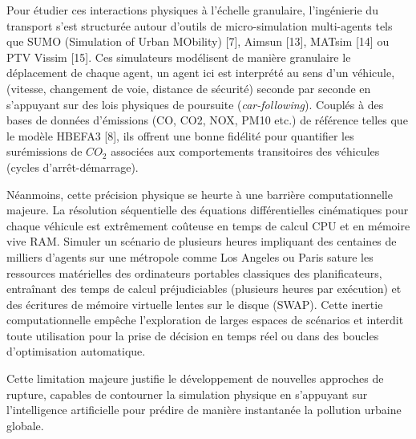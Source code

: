 \documentclass[10pt, a4paper]{article}
\begin{document}
Pour étudier ces interactions physiques à l'échelle granulaire,
l'ingénierie du transport s'est structurée autour d'outils de
micro-simulation multi-agents tels que SUMO (Simulation of Urban
MObility) {[}7{]}, Aimsun {[}13{]}, MATsim {[}14{]} ou PTV Vissim
{[}15{]}. Ces simulateurs modélisent de manière granulaire le
déplacement de chaque agent, un agent ici est interprété au sens d'un
véhicule, (vitesse, changement de voie, distance de sécurité) seconde
par seconde en s'appuyant sur des lois physiques de poursuite
(\emph{car-following}). Couplés à des bases de données d'émissions (CO,
CO2, NOX, PM10 etc.) de référence telles que le modèle HBEFA3 {[}8{]},
ils offrent une bonne fidélité pour quantifier les surémissions de
\(CO_2\) associées aux comportements transitoires des véhicules (cycles
d'arrêt-démarrage).

Néanmoins, cette précision physique se heurte à une barrière
computationnelle majeure. La résolution séquentielle des équations
différentielles cinématiques pour chaque véhicule est extrêmement
coûteuse en temps de calcul CPU et en mémoire vive RAM. Simuler un
scénario de plusieurs heures impliquant des centaines de milliers
d'agents sur une métropole comme Los Angeles ou Paris sature les
ressources matérielles des ordinateurs portables classiques des
planificateurs, entraînant des temps de calcul préjudiciables (plusieurs
heures par exécution) et des écritures de mémoire virtuelle lentes sur
le disque (SWAP). Cette inertie computationnelle empêche l'exploration
de larges espaces de scénarios et interdit toute utilisation pour la
prise de décision en temps réel ou dans des boucles d'optimisation
automatique.

Cette limitation majeure justifie le développement de nouvelles
approches de rupture, capables de contourner la simulation physique en
s'appuyant sur l'intelligence artificielle pour prédire de manière
instantanée la pollution urbaine globale.
\end{document}
